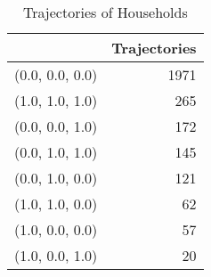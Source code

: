 \begin{table}
\centering
\caption{Trajectories of Households}
\label{tbl:Trajectories}
\begin{tabular}{lr}
\toprule
{} &  Trajectories \\
\midrule
(0.0, 0.0, 0.0) &          1971 \\
(1.0, 1.0, 1.0) &           265 \\
(0.0, 0.0, 1.0) &           172 \\
(0.0, 1.0, 1.0) &           145 \\
(0.0, 1.0, 0.0) &           121 \\
(1.0, 1.0, 0.0) &            62 \\
(1.0, 0.0, 0.0) &            57 \\
(1.0, 0.0, 1.0) &            20 \\
\bottomrule
\end{tabular}
\end{table}

